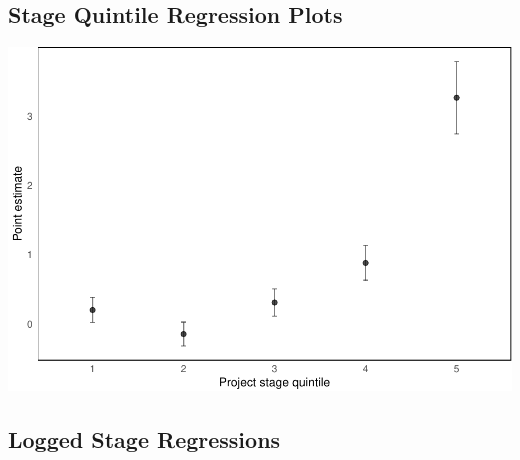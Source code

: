 \documentclass[
]{article}
\begin{document}
\hypertarget{stage-quintile-regression-plots}{%
\subsection{Stage Quintile Regression
Plots}\label{stage-quintile-regression-plots}}

\includegraphics{qp_first_pc_delay-2_files/figure-latex/stage_quintile-1.pdf}

\hypertarget{logged-stage-regressions}{%
\subsection{Logged Stage Regressions}\label{logged-stage-regressions}}
\end{document}
